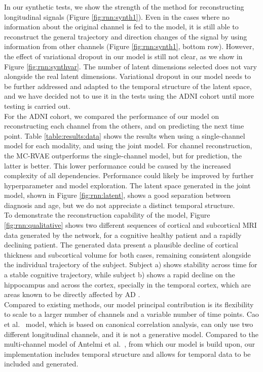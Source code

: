 In our synthetic tests, we show the strength of the method for reconstructing longitudinal signals (Figure \ref{fig:rnn:synth1}). Even in the cases where no information about the original channel is fed to the model, it is still able to reconstruct the general trajectory and direction changes of the signal by using information from other channels (Figure \ref{fig:rnn:synth1}, bottom row). However, the effect of variational dropout in our model is still not clear, as we show in Figure \ref{fig:rnn:synthvar}. The number of latent dimensions selected does not vary alongside the real latent dimensions. Variational dropout in our model needs to be further addressed and adapted to the temporal structure of the latent space, and we have decided not to use it in the tests using the ADNI cohort until more testing is carried out.  \\

For the ADNI cohort, we compared the performance of our model on reconstructing each channel from the others, and on predicting the next time point. Table \ref{table:results:data} shows the results when using a single-channel model for each modality, and using the joint model. For channel reconstruction, the MC-RVAE outperforms the single-channel model, but for prediction, the latter is better. This lower performance could be caused by the increased complexity of all dependencies. Performance could likely be improved by further hyperparameter and model exploration. The latent space generated in the joint model, shown in Figure \ref{fig:rnn:latent}, shows a good separation between diagnosis and age, but we do not appreciate a distinct temporal structure.  \\

To demonstrate the reconstruction capability of the model, Figure \ref{fig:rnn:qualitative} shows two different sequences of cortical and subcortical MRI data generated by the network, for a cognitive healthy patient and a rapidly declining patient. The generated data present a plausible decline of cortical thickness and subcortical volume for both cases, remaining consistent alongside the individual trajectory of the subject. Subject a) shows stability across time for a stable cognitive trajectory, while subject b) shows a rapid decline on the hippocampus and across the cortex, specially in the temporal cortex, which are areas known to be directly affected by AD \cite{Bakkour2013}. \\

Compared to existing methods, our model principal contribution is its flexibility to scale to a larger number of channels and a variable number of time points. Cao et al.\ \cite{Cao2019} model, which is based on canonical correlation analysis, can only use two different longitudinal channels, and it is not a generative model. Compared to the multi-channel model of Antelmi et al.\ \cite{Antelmi2019}, from which our model is build upon, our implementation includes temporal structure and allows for temporal data to be included and generated. \\


